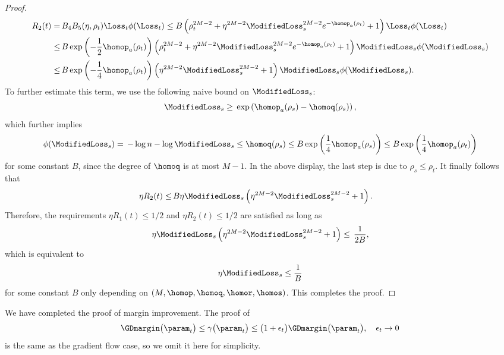 \begin{proof}
    \begin{align*}
        R_2 (t) = \, & B_4 B_5 (\eta, \rho_t) \Loss_t \phi(\Loss_t) \le B \left( \rho_t^{2 M - 2} + \eta^{2M - 2} \ModifiedLoss_s^{2M - 2} e^{- \homop_a(\rho_t)} + 1 \right) \Loss_t \phi(\Loss_t) \\
        \le \, & B \exp \left(- \frac{1}{2} \homop_a (\rho_t) \right) \left( \rho_t^{2 M - 2} + \eta^{2M - 2} \ModifiedLoss_s^{2M - 2} e^{- \homop_a(\rho_t)} + 1 \right) \ModifiedLoss_s  \phi(\ModifiedLoss_s) \\
        \le \, & B \exp \left(- \frac{1}{4} \homop_a (\rho_t) \right) \left( \eta^{2M - 2} \ModifiedLoss_s^{2M - 2} + 1 \right) \ModifiedLoss_s  \phi(\ModifiedLoss_s).
    \end{align*}
    To further estimate this term, we use the following naive bound on $\ModifiedLoss_s$:
    \begin{equation*}
        \ModifiedLoss_s \ge \, \exp \left( \homop_a (\rho_s) - \homoq (\rho_s) \right),
    \end{equation*}
    which further implies
    \begin{equation*}
        \phi(\ModifiedLoss_s) = \, - \log n - \log \ModifiedLoss_s \le \homoq (\rho_s) \le B \exp \left( \frac{1}{4} \homop_a (\rho_s) \right) \le B \exp \left( \frac{1}{4} \homop_a (\rho_t) \right)
    \end{equation*}
    for some constant $B$, since the degree of $\homoq$ is at most $M - 1$. In the above display, the last step is due to $\rho_s \le \rho_t$. It finally follows that
    \begin{align*}
        \eta R_2 (t) \le \, & B \eta \ModifiedLoss_s \left( \eta^{2M - 2} \ModifiedLoss_s^{2M - 2} + 1 \right).
    \end{align*}
    Therefore, the requirements $\eta R_1 (t) \le 1/2$ and $\eta R_2 (t) \le 1/2$ are satisfied as long as
    \begin{equation*}
        \eta \ModifiedLoss_s \left( \eta^{2M - 2} \ModifiedLoss_s^{2M - 2} + 1 \right) \le \, \frac{1}{2 B},
    \end{equation*}
    which is equivalent to
    \begin{equation*}
        \eta \ModifiedLoss_s \le \frac{1}{B}
    \end{equation*}
    for some constant $B$ only depending on $(M, \homop, \homoq, \homor, \homos)$. This completes the proof.
\end{proof}
We have completed the proof of margin improvement. The proof of 
\begin{equation*}%
    \GDmargin\big(\param_t\big) \le \gamma\big(\param_t\big) \le \big(1+\epsilon_t\big) \GDmargin\big(\param_t\big), \quad \epsilon_t \to 0
\end{equation*}
is the same as the gradient flow case, so we omit it here for simplicity.

